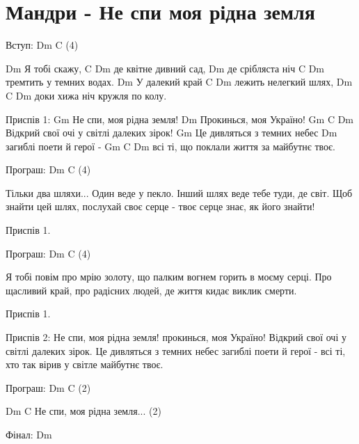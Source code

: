﻿\section{Мандри - Не спи моя рідна земля}
\begin{guitar}
Вступ:  Dm C  (4)

Dm
Я тобі скажу,
     C            Dm
де квітне дивний сад,
 Dm
де срібляста ніч
     C             Dm
тремтить у темних водах.
Dm
У далекий край
   C              Dm
лежить нелегкий шлях,
 Dm                C     Dm
доки хижа ніч кружля по колу.

Приспів 1:
     Gm
Не спи, моя рідна земля!
    Dm
Прокинься, моя Україно!
     Gm              C               Dm
Відкрий свої очі у світлі далеких зірок!
     Gm
Це дивляться з темних небес
   Dm
загиблі поети й герої -
     Gm                C                Dm
всі ті, що поклали життя за майбутнє твоє.

Програш:  Dm C  (4)

Тільки два шляхи...
Один веде у пекло.
Інший шлях веде
тебе туди, де світ.
Щоб знайти цей шлях,
послухай своє серце -
твоє серце знає,
як його знайти!

Приспів 1.

Програш:  Dm C  (4)

Я тобі повім
про мрію золоту,
що палким вогнем
горить в моєму серці.
Про щасливий край,
про радісних людей,
де життя кидає виклик смерти.

Приспів 1.

Приспів 2:
Не спи, моя рідна земля!
прокинься, моя Україно!
Відкрий свої очі у світлі далеких зірок.
Це дивляться з темних небес
загиблі поети й герої -
всі ті, хто так вірив у світле майбутнє твоє.

Програш:  Dm C  (2)

     Dm                 C
Не спи, моя рідна земля...  (2)

Фінал:  Dm
\end{guitar}